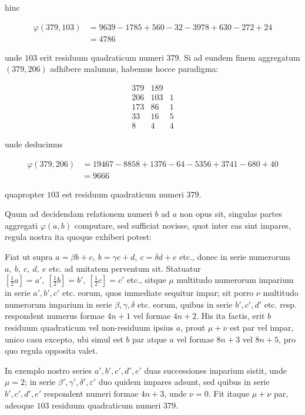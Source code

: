 hinc

\[
\begin{aligned}
\varphi(379,103)&=9639-1785+560-32-3978+630-272+24\\
&=4786
\end{aligned}
\]

unde $103$ erit residuum quadraticum numeri $379$. Si ad eundem finem aggregatum $(379,206)$ adhibere malumus, habemus hocce paradigma:

\[
\begin{array}{r|r|l}
379&189&\\
206&103&1\\
173&86&1\\
33&16&5\\
8&4&4
\end{array}
\]

unde deducimus

%
\[
\begin{aligned}
\varphi(379,206)&=19467-8858+1376-64-5356+3741-680+40\\
&=9666
\end{aligned}
\]

quapropter $103$ est residuum quadraticum numeri $379$.


Quum ad decidendam relationem numeri $b$ ad $a$ non opus sit, singulas partes aggregati $\varphi(a,b)$ computare, sed sufficiat novisse, quot inter eas sint impares, regula nostra ita quoque exhiberi potest:

Fiat ut supra $a=\beta b+c,\ b=\gamma c+d,\ c=\delta d+e$ etc., donec in serie numerorum $a,\ b,\ c,\ d,\ e$ etc. ad unitatem perventum sit. Statuatur $[\frac12a]=a',\ [\frac12b]=b',\ [\frac12c]=c'$ etc., sitque $\mu$ multitudo numerorum imparium in serie $a',b',c'$ etc. eorum, quos immediate sequitur impar; sit porro $\nu$ multitudo numerorum imparium in serie $\beta,\gamma,\delta$ etc. eorum, quibus in serie $b',c',d'$ etc. resp. respondent numerus formae $4n+1$ vel formae $4n+2$. His ita factis, erit $b$ residuum quadraticum vel non-residuum ipsius $a$, prout $\mu+\nu$ est par vel impar, unico casu excepto, ubi simul est $b$ par atque $a$ vel formae $8n+3$ vel $8n+5$, pro quo regula opposita valet.

In exemplo nostro series $a',b',c',d',e'$ duas successiones imparium sistit, unde $\mu=2$; in serie $\beta',\gamma',\delta',\varepsilon'$ duo quidem impares adsunt, sed quibus in serie $b',c',d',e'$ respondent numeri formae $4n+3$, unde $\nu=0$. Fit itaque $\mu+\nu$ par, adeoque $103$ residuum quadraticum numeri $379$.

\BookRule{42mm}

